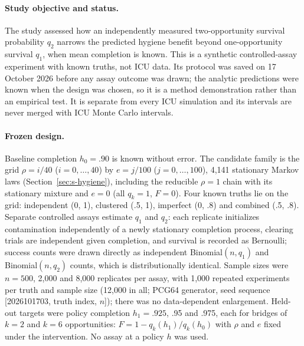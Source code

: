 \paragraph{Study objective and status.} The study assessed how an independently measured
two-opportunity survival probability $q_2$ narrows the predicted hygiene benefit
beyond one-opportunity survival $q_1$, when mean completion is known. This is a
synthetic controlled-assay experiment with known truths, not ICU data. Its
protocol was saved on 17 October 2026 before any assay outcome was drawn; the
analytic predictions were known when the design was chosen, so it is a method
demonstration rather than an empirical test. It is separate from every ICU
simulation and its intervals are never merged with ICU Monte Carlo intervals.

\paragraph{Frozen design.} Baseline completion $h_0=.90$ is known without error.
The candidate family is the grid $\rho=i/40$ ($i=0,\dots,40$) by $e=j/100$
($j=0,\dots,100$), 4,141 stationary Markov laws (Section~\ref{sec:s-hygiene}),
including the reducible $\rho=1$ chain with its stationary mixture and $e=0$
(all $q_k=1$, $F=0$). Four known truths lie on the grid: independent (0, 1),
clustered (.5, 1), imperfect (0, .8) and combined (.5, .8). Separate controlled
assays estimate $q_1$ and $q_2$: each replicate initializes contamination
independently of a newly stationary completion process, clearing trials are
independent given completion, and survival is recorded as Bernoulli; success
counts were drawn directly as independent Binomial$(n,q_1)$ and
Binomial$(n,q_2)$ counts, which is distributionally identical. Sample sizes were
$n=500$, 2,000 and 8,000 replicates per assay, with 1,000 repeated experiments per
truth and sample size (12,000 in all; PCG64 generator, seed sequence
[2026101703, truth index, $n$]); there was no data-dependent enlargement. Held-out
targets were policy completion $h_1=.925$, .95 and .975, each for bridges of $k=2$
and $k=6$ opportunities: $F=1-q_k(h_1)/q_k(h_0)$ with $\rho$ and $e$ fixed under
the intervention. No assay at a policy $h$ was used.

